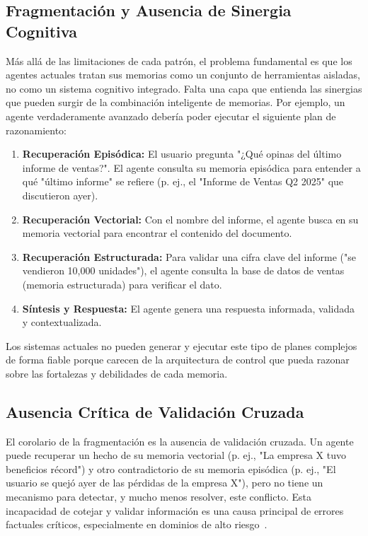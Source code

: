 \documentclass[journal,onecolumn]{IEEEtran}
\begin{document}
\subsection{Fragmentación y Ausencia de Sinergia Cognitiva}
Más allá de las limitaciones de cada patrón, el problema fundamental es que los agentes actuales tratan sus memorias como un conjunto de herramientas aisladas, no como un sistema cognitivo integrado. Falta una capa que entienda las sinergias que pueden surgir de la combinación inteligente de memorias. Por ejemplo, un agente verdaderamente avanzado debería poder ejecutar el siguiente plan de razonamiento:
\begin{enumerate}
    \item \textbf{Recuperación Episódica:} El usuario pregunta "¿Qué opinas del último informe de ventas?". El agente consulta su memoria episódica para entender a qué "último informe" se refiere (p. ej., el "Informe de Ventas Q2 2025" que discutieron ayer).
    \item \textbf{Recuperación Vectorial:} Con el nombre del informe, el agente busca en su memoria vectorial para encontrar el contenido del documento.
    \item \textbf{Recuperación Estructurada:} Para validar una cifra clave del informe ("se vendieron 10,000 unidades"), el agente consulta la base de datos de ventas (memoria estructurada) para verificar el dato.
    \item \textbf{Síntesis y Respuesta:} El agente genera una respuesta informada, validada y contextualizada.
\end{enumerate}
Los sistemas actuales no pueden generar y ejecutar este tipo de planes complejos de forma fiable porque carecen de la arquitectura de control que pueda razonar sobre las fortalezas y debilidades de cada memoria.

\subsection{Ausencia Crítica de Validación Cruzada}
El corolario de la fragmentación es la ausencia de validación cruzada. Un agente puede recuperar un hecho de su memoria vectorial (p. ej., "La empresa X tuvo beneficios récord") y otro contradictorio de su memoria episódica (p. ej., "El usuario se quejó ayer de las pérdidas de la empresa X"), pero no tiene un mecanismo para detectar, y mucho menos resolver, este conflicto. Esta incapacidad de cotejar y validar información es una causa principal de errores factuales críticos, especialmente en dominios de alto riesgo~\cite{zhang2024survey}.
\end{document}
